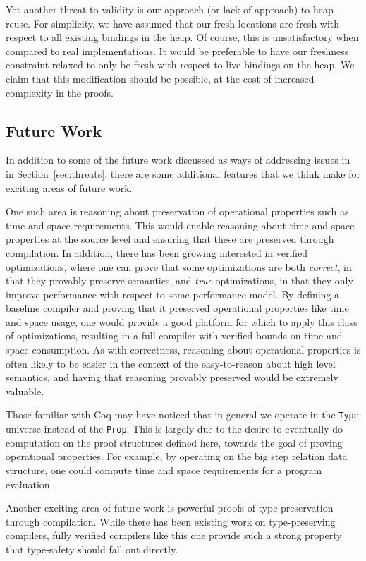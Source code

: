 Yet another threat to validity is our approach (or lack of approach) to
heap-reuse. For simplicity, we have assumed that our fresh locations are fresh
with respect to all existing bindings in the heap. Of course, this is
unsatisfactory when compared to real implementations. It would be preferable to
have our freshness constraint relaxed to only be fresh with respect to live
bindings on the heap. We claim that this modification should be possible, at the
cost of increased complexity in the proofs. 

\subsection{Future Work}

In addition to some of the future work discussed as ways of addressing issues in
in Section~\ref{sec:threats}, there are some additional features that we think
make for exciting areas of future work. 

One such area is reasoning about preservation of operational properties such as
time and space requirements. This would enable reasoning about time and space
properties at the source level and ensuring that these are preserved through
compilation. In addition, there has been growing interested in verified
optimizations, where one can prove that some optimizations are both
\emph{correct}, in that they provably preserve semantics, and \emph{true}
optimizations, in that they only improve performance with respect to some
performance model. By defining a baseline compiler and proving that it preserved
operational properties like time and space usage, one would provide a good
platform for which to apply this class of optimizations, resulting in a full
compiler with verified bounds on time and space consumption. As with
correctness, reasoning about operational properties is often likely to be easier
in the context of the easy-to-reason about high level semantics, and having that
reasoning provably preserved would be extremely valuable. 

Those familiar with Coq may have noticed that in general we operate in the
\texttt{Type} universe instead of the \texttt{Prop}. This is largely due to the
desire to eventually do computation on the proof structures defined here,
towards the goal of proving operational properties. For example, by operating on 
the big step relation data structure, one could compute time and space
requirements for a program evaluation.

Another exciting area of future work is powerful proofs of type preservation
through compilation.  While there has been existing work on type-preserving
compilers, fully verified compilers like this one provide such a strong property
that type-safety should fall out directly.

